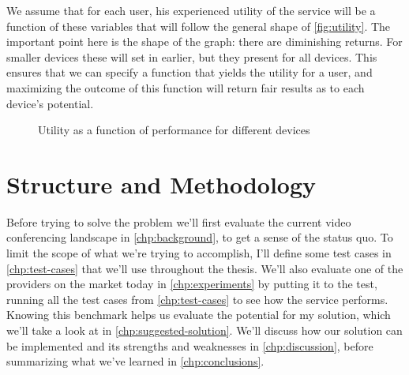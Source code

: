 We assume that for each user, his experienced utility of the service will be a function of these variables that will follow the general shape of \autoref{fig:utility}. The important point here is the shape of the graph: there are diminishing returns. For smaller devices these will set in earlier, but they present for all devices. This ensures that we can specify a function that yields the utility for a user, and maximizing the outcome of this function will return fair results as to each device's potential.

\begin{figure}
    \centering
    \caption{Utility as a function of performance for different devices}
    \label{fig:utility}
\end{figure}


\section{Structure and Methodology}

Before trying to solve the problem we'll first evaluate the current video conferencing landscape in \autoref{chp:background}, to get a sense of the status quo. To limit the scope of what we're trying to accomplish, I'll define some test cases in \autoref{chp:test-cases} that we'll use throughout the thesis. We'll also evaluate one of the providers on the market today in \autoref{chp:experiments} by putting it to the test, running all the test cases from \autoref{chp:test-cases} to see how the service performs. Knowing this benchmark helps us evaluate the potential for my solution, which we'll take a look at in \autoref{chp:suggested-solution}. We'll discuss how our solution can be implemented and its strengths and weaknesses in \autoref{chp:discussion}, before summarizing what we've learned in \autoref{chp:conclusions}.


